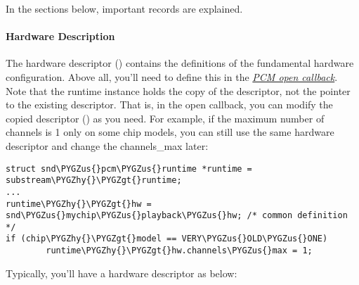 \documentclass[a4paper,8pt,english]{sphinxmanual}
\def\PYGZus{\char`\_}
\def\PYGZgt{\char`\>}
\def\PYGZhy{\char`\-}
\begin{document}
In the sections below, important records are explained.


\paragraph{Hardware Description}
\label{sound/kernel-api/writing-an-alsa-driver:hardware-description}
The hardware descriptor () contains the definitions of the fundamental
hardware configuration. Above all, you'll need to define this in the
{\hyperref[sound/kernel\string-api/writing\string-an\string-alsa\string-driver:pcm\string-open\string-callback]{\emph{PCM open callback}}}. Note that the runtime instance holds the copy of
the descriptor, not the pointer to the existing descriptor. That is,
in the open callback, you can modify the copied descriptor
() as you need. For example, if the maximum number of
channels is 1 only on some chip models, you can still use the same
hardware descriptor and change the channels\_max later:

\begin{Verbatim}[commandchars=\\\{\}]
struct snd\PYGZus{}pcm\PYGZus{}runtime *runtime = substream\PYGZhy{}\PYGZgt{}runtime;
...
runtime\PYGZhy{}\PYGZgt{}hw = snd\PYGZus{}mychip\PYGZus{}playback\PYGZus{}hw; /* common definition */
if (chip\PYGZhy{}\PYGZgt{}model == VERY\PYGZus{}OLD\PYGZus{}ONE)
        runtime\PYGZhy{}\PYGZgt{}hw.channels\PYGZus{}max = 1;
\end{Verbatim}

Typically, you'll have a hardware descriptor as below:
\end{document}
